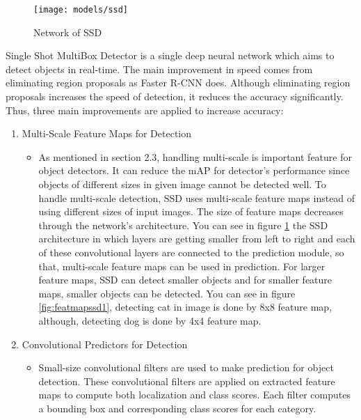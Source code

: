 \documentclass{article}
\begin{document}
\setlength{\parindent}{6ex}

\begin{figure}
    \centering
    \texttt{[image: models/ssd]}
    \caption{Network of SSD}
    \label{fig:ssd1}
\end{figure}

\indent

Single Shot MultiBox Detector is a single deep neural network which aims to detect 
objects in real-time. The main improvement in speed comes from eliminating region 
proposals as Faster R-CNN does. Although eliminating region proposals increases 
the speed of detection, it reduces the accuracy significantly. Thus, three main 
improvements are applied to increase accuracy:

\begin{enumerate}
    \item Multi-Scale Feature Maps for Detection
    \begin{itemize}
        \item As mentioned in section 2.3, handling multi-scale is important feature 
for object detectors. It can reduce the mAP for detector's performance since objects 
of different sizes in given image cannot be detected well. To handle multi-scale detection, 
SSD uses multi-scale feature maps instead of using different sizes of input images. 
The size of feature maps decreases through the network's architecture. You can see in figure 
\ref{fig:ssd1} the SSD architecture in which layers are getting smaller from left to right and 
each of these convolutional layers are connected to the prediction module, so that, multi-scale 
feature maps can be used in prediction. For larger feature maps, SSD can detect smaller objects 
and for smaller feature maps, smaller objects can be detected. You can see in figure 
\ref{fig:featmapssd1}, detecting cat in image is done by 8x8 feature map, although, detecting 
dog is done by 4x4 feature map.
    \end{itemize}
    \item Convolutional Predictors for Detection
    \begin{itemize}
        \item Small-size convolutional filters are used to make prediction for 
object detection. These convolutional filters are applied on extracted feature maps 
to compute both localization and class scores. Each filter computes a bounding box and 
corresponding class scores for each category.
    \end{itemize}

\end{enumerate}
\end{document}
